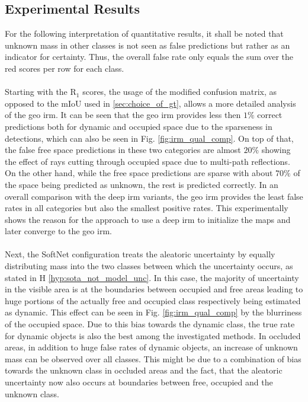 \subsection{Experimental Results}
\label{subsec:exp_results_aleat_uncert}
For the following interpretation of quantitative results, it shall be noted that unknown mass in other classes is not seen as false predictions but rather as an indicator for certainty. Thus, the overall false rate only equals the sum over the red scores per row for each class. 
\\\\
Starting with the R$_1$ scores, the usage of the modified confusion matrix, as opposed to the mIoU used in \ref{sec:choice_of_gt}, allows a more detailed analysis of the geo \gls{irm}. It can be seen that the geo \gls{irm} provides less then $1\%$ correct predictions both for dynamic and occupied space due to the sparseness in detections, which can also be seen in Fig. \ref{fig:irm_qual_comp}. On top of that, the false free space predictions in these two categories are almost $20\%$ showing the effect of rays cutting through occupied space due to multi-path reflections. On the other hand, while the free space predictions are sparse with about $70\%$ of the space being predicted as unknown, the rest is predicted correctly. In an overall comparison with the deep \gls{irm} variants, the geo \gls{irm} provides the least false rates in all categories but also the smallest positive rates. This experimentally shows the reason for the approach to use a deep \gls{irm} to initialize the maps and later converge to the geo \gls{irm}.
\\\\
Next, the SoftNet configuration treats the aleatoric uncertainty by equally distributing mass into the two classes between which the uncertainty occurs, as stated in H \ref{hyp:sota_not_model_unc}. In this case, the majority of uncertainty in the visible area is at the boundaries between occupied and free areas leading to huge portions of the actually free and occupied class respectively being estimated as dynamic. This effect can be seen in Fig. \ref{fig:irm_qual_comp} by the blurriness of the occupied space. Due to this bias towards the dynamic class, the true rate for dynamic objects is also the best among the investigated methods. In occluded areas, in addition to huge false rates of dynamic objects, an increase of unknown mass can be observed over all classes. This might be due to a combination of bias towards the unknown class in occluded areas and the fact, that the aleatoric uncertainty now also occurs at boundaries between free, occupied and the unknown class. 
